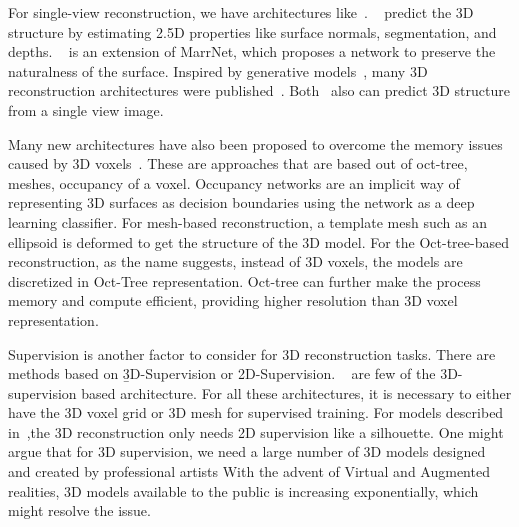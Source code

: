 For single-view reconstruction, we have architectures like~\cite{Wu2017,z-gan, Yang2019, Wu2018, popov2020corenet}.
~\cite{Wu2017} predict the 3D structure by estimating 2.5D properties like surface normals, segmentation, and depths.
~\cite{Wu2018} is an extension of MarrNet, which proposes a network to preserve the naturalness of the surface.
Inspired by generative models~\cite{Goodfellow2014,Kingma2014}, many 3D reconstruction architectures were published~\cite{z-gan, Yang2019,Wu2016,Lunz2020InverseGG}.
Both~\cite{Xie_2019, Xie_2020} also can predict 3D structure from a single view image.

Many new architectures have also been proposed to overcome the memory issues caused by 3D voxels~\cite{tatarchenko2017octree,Roth2018,Mescheder2019OccupancyNL,Gkioxari2019MeshR, wang2018pixel2mesh,groueix2018atlasnet,pan2019deep}.
These are approaches that are based out of oct-tree, meshes, occupancy of a voxel.
Occupancy networks are an implicit way of representing 3D surfaces as decision boundaries using the network as a deep learning classifier.
For mesh-based reconstruction, a template mesh such as an ellipsoid is deformed to get the structure of the 3D model.
For the Oct-tree-based reconstruction, as the name suggests, instead of 3D voxels, the models are discretized in Oct-Tree representation.
Oct-tree can further make the process memory and compute efficient, providing higher resolution than 3D voxel representation.

Supervision is another factor to consider for 3D reconstruction tasks.
There are methods based on \b{3D-Supervision or 2D-Supervision}.
~\cite{Xie_2019,Xie_2020,Wu2017,groueix2018atlasnet,pan2019deep, chen2019learning} are few of the 3D-supervision based architecture.
For all these architectures, it is necessary to either have the 3D voxel grid or 3D mesh for supervised training.
For models described in~\cite{Lunz2020InverseGG,henderson2019learning},the 3D reconstruction only needs 2D supervision like a silhouette.
One might argue that for 3D supervision, we need a large number of 3D models designed and created by professional artists
With the advent of Virtual and Augmented realities, 3D models available to the public is increasing exponentially, which might resolve the issue.


